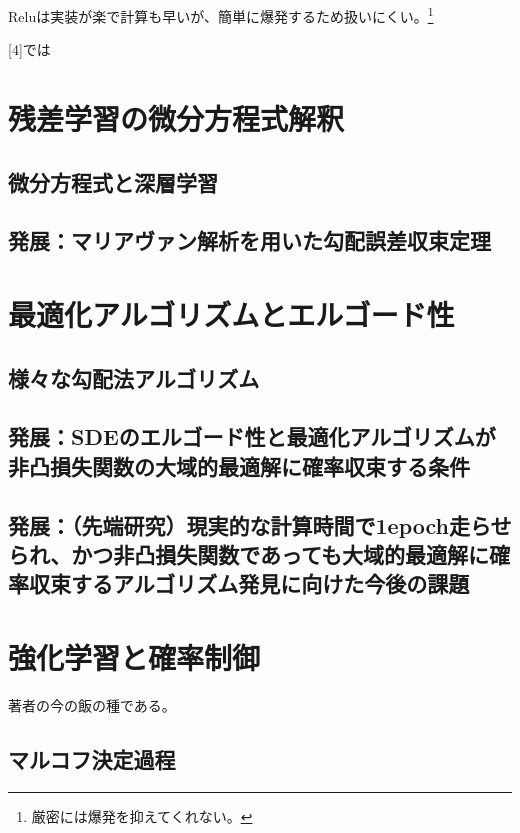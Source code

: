 \documentclass{jsarticle}
\begin{document}
Reluは実装が楽で計算も早いが、簡単に爆発するため扱いにくい。\footnote{厳密には爆発を抑えてくれない。}

[4]では



\newpage

\section{残差学習の微分方程式解釈}

\subsection{微分方程式と深層学習}


\subsection{発展：マリアヴァン解析を用いた勾配誤差収束定理}


\newpage
\section{最適化アルゴリズムとエルゴード性}

\subsection{様々な勾配法アルゴリズム}



\subsection{発展：SDEのエルゴード性と最適化アルゴリズムが非凸損失関数の大域的最適解に確率収束する条件}


\subsection{発展：（先端研究）現実的な計算時間で1epoch走らせられ、かつ非凸損失関数であっても大域的最適解に確率収束するアルゴリズム発見に向けた今後の課題}

\newpage

\section{強化学習と確率制御}
著者の今の飯の種である。
\subsection{マルコフ決定過程}
\end{document}
